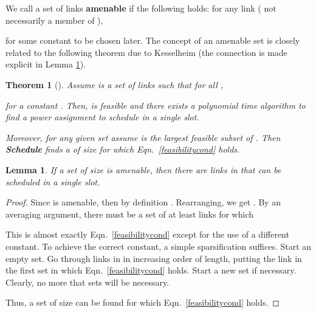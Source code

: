 \documentclass[11pt]{amsart}
\newcommand{\amenable}{amenable}
\newcounter{foo}
\newtheorem{theorem}[foo]{Theorem}
\newtheorem{lemma}[foo]{Lemma}
\begin{document}
We call a set of links  \textbf{\amenable} if the following holds:
for any link  ( not necessarily a member of ), 

for some constant  to be chosen later. The concept of an amenable set is closely related to the following
theorem due to Kesselheim (the connection is made explicit in Lemma \ref{lem:constantsizeapprox}).

\begin{theorem}[\cite{KesselheimSoda11}]
Assume  is a set of links such that for all ,

for a constant .
Then,  is feasible and there exists a polynomial time algorithm to find a power assignment to schedule  in a single slot.

Moreover, for any given set  assume  is the largest feasible subset of . Then \textbf{Schedule} finds a  of size  for which Eqn.~\ref{feasibilitycond} holds.
\label{kessel}
\end{theorem}

\begin{lemma}
If a set  of size  is amenable, then there are  links in  that can be scheduled in a single slot.
\label{lem:constantsizeapprox}
\end{lemma}
\begin{proof}
Since  is amenable, then by definition . Rearranging,
we get . By an averaging argument, there
must be a set  of at least  links for which 

This is almost exactly Eqn.~\ref{feasibilitycond} except for the use
of a different constant. To achieve the correct 
constant, a simple sparsification suffices. Start an empty set.
Go through links in  in increasing order of length, putting the link in the first set in which Eqn.~\ref{feasibilitycond} holds.
Start a new set if necessary. Clearly, no more that  sets will be necessary.

Thus, a set of size  can be found for which Eqn.~\ref{feasibilitycond} holds.
\end{proof}
\end{document}
